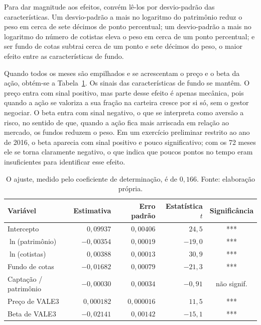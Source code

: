 \documentclass[12pt,a4paper]{article}
\begin{document}
Para dar magnitude aos efeitos, convém lê-los por desvio-padrão das características. Um
desvio-padrão a mais no logaritmo do patrimônio reduz o peso em cerca de sete décimos de ponto
percentual; um desvio-padrão a mais no logaritmo do número de cotistas eleva o peso em cerca de
um ponto percentual; e ser fundo de cotas subtrai cerca de um ponto e sete décimos do peso, o
maior efeito entre as características de fundo.

Quando todos os meses são empilhados e se acrescentam o preço e o beta da ação, obtém-se a
Tabela~\ref{tab:pool}. Os sinais das características de fundo se mantêm. O preço entra com
sinal positivo, mas parte desse efeito é apenas mecânica, pois quando a ação se valoriza a
sua fração na carteira cresce por si só, sem o gestor negociar. O beta entra com sinal
negativo, o que se interpreta como aversão a risco, no sentido de que, quando a ação fica
mais arriscada em relação ao mercado, os fundos reduzem o peso. Em um exercício preliminar
restrito ao ano de 2016, o beta aparecia com sinal positivo e pouco significativo; com os 72
meses ele se torna claramente negativo, o que indica que poucos pontos no tempo eram
insuficientes para identificar esse efeito.

\begin{table}[h]\centering\small
\caption{Regressão com todos os meses empilhados, incluindo preço e beta (11.413 observações).}
\label{tab:pool}
\begin{tabular}{@{}lrrrc@{}}
\toprule
Variável & Estimativa & Erro padrão & Estatística $t$ & Significância \\
\midrule
Intercepto              & $0{,}09937$  & $0{,}00406$ & $24{,}5$   & *** \\
$\ln$(patrimônio)       & $-0{,}00354$ & $0{,}00019$ & $-19{,}0$  & *** \\
$\ln$(cotistas)         & $0{,}00388$  & $0{,}00013$ & $30{,}9$   & *** \\
Fundo de cotas          & $-0{,}01682$ & $0{,}00079$ & $-21{,}3$  & *** \\
Captação / patrimônio   & $-0{,}00030$ & $0{,}00034$ & $-0{,}91$  & não signif. \\
Preço de VALE3          & $0{,}000182$ & $0{,}000016$& $11{,}5$   & *** \\
Beta de VALE3           & $-0{,}02141$ & $0{,}00142$ & $-15{,}1$  & *** \\
\bottomrule
\end{tabular}
\caption*{\footnotesize O ajuste, medido pelo coeficiente de determinação, é de $0{,}166$.
Fonte: elaboração própria.}
\end{table}
\end{document}
